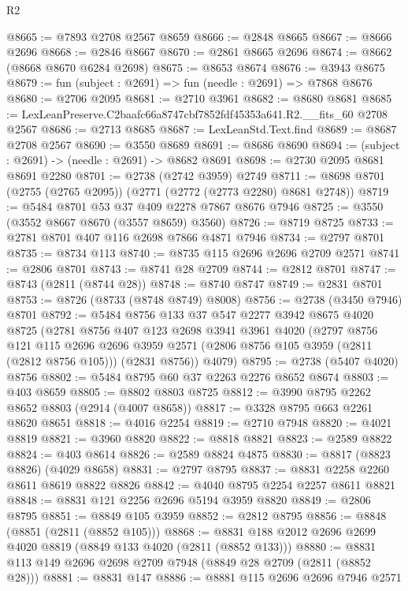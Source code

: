 \begin{lexlean}{R2}
\begin{coremodule}
@8665 := @7893 @2708 @2567 @8659
@8666 := @2848 @8665
@8667 := @8666 @2696
@8668 := @2846 @8667
@8670 := @2861 @8665 @2696
@8674 := @8662 (@8668 @8670 @6284 @2698)
@8675 := @8653 @8674
@8676 := @3943 @8675
@8679 := fun (subject : @2691) => fun (needle : @2691) => @7868 @8676
@8680 := @2706 @2095
@8681 := @2710 @3961
@8682 := @8680 @8681
@8685 := LexLeanPreserve.C2baafc66a8747cbf7852fdf45353a641.R2.__fits_60 @2708 @2567
@8686 := @2713 @8685
@8687 := LexLeanStd.Text.find
@8689 := @8687 @2708 @2567
@8690 := @3550 @8689
@8691 := @8686 @8690
@8694 := (subject : @2691) -> (needle : @2691) -> @8682 @8691
@8698 := @2730 @2095 @8681 @8691 @2280
@8701 := @2738 (@2742 @3959) @2749
@8711 := @8698 @8701 (@2755 (@2765 @2095)) (@2771 (@2772 (@2773 @2280) @8681 @2748))
@8719 := @5484 @8701 @53 @37 @409 @2278 @7867 @8676 @7946
@8725 := @3550 (@3552 @8667 @8670 (@3557 @8659) @3560)
@8726 := @8719 @8725
@8733 := @2781 @8701 @407 @116 @2698 @7866 @4871 @7946
@8734 := @2797 @8701
@8735 := @8734 @113
@8740 := @8735 @115 @2696 @2696 @2709 @2571
@8741 := @2806 @8701
@8743 := @8741 @28 @2709
@8744 := @2812 @8701
@8747 := @8743 (@2811 (@8744 @28))
@8748 := @8740 @8747
@8749 := @2831 @8701
@8753 := @8726 (@8733 (@8748 @8749) @8008)
@8756 := @2738 (@3450 @7946) @8701
@8792 := @5484
    @8756
    @133
    @37
    @547
    @2277
    @3942
    @8675
    @4020
    @8725
    (@2781
      @8756
      @407
      @123
      @2698
      @3941
      @3961
      @4020
      (@2797
        @8756
        @121
        @115
        @2696
        @2696
        @3959
        @2571
        (@2806 @8756 @105 @3959 (@2811 (@2812 @8756 @105)))
        (@2831 @8756))
      @4079)
@8795 := @2738 (@5407 @4020) @8756
@8802 := @5484 @8795 @60 @37 @2263 @2276 @8652 @8674
@8803 := @403 @8659
@8805 := @8802 @8803 @8725
@8812 := @3990 @8795 @2262 @8652 @8803 (@2914 (@4007 @8658))
@8817 := @3328 @8795 @663 @2261 @8620 @8651
@8818 := @4016 @2254
@8819 := @2710 @7948
@8820 := @4021 @8819
@8821 := @3960 @8820
@8822 := @8818 @8821
@8823 := @2589 @8822
@8824 := @403 @8614
@8826 := @2589 @8824 @4875
@8830 := @8817 (@8823 @8826) (@4029 @8658)
@8831 := @2797 @8795
@8837 := @8831 @2258 @2260 @8611 @8619 @8822 @8826
@8842 := @4040 @8795 @2254 @2257 @8611 @8821
@8848 := @8831 @121 @2256 @2696 @5194 @3959 @8820
@8849 := @2806 @8795
@8851 := @8849 @105 @3959
@8852 := @2812 @8795
@8856 := @8848 (@8851 (@2811 (@8852 @105)))
@8868 := @8831 @188 @2012 @2696 @2699 @4020 @8819 (@8849 @133 @4020 (@2811 (@8852 @133)))
@8880 := @8831 @113 @149 @2696 @2698 @2709 @7948 (@8849 @28 @2709 (@2811 (@8852 @28)))
@8881 := @8831 @147
@8886 := @8881 @115 @2696 @2696 @7946 @2571

\end{coremodule}
\end{lexlean}
